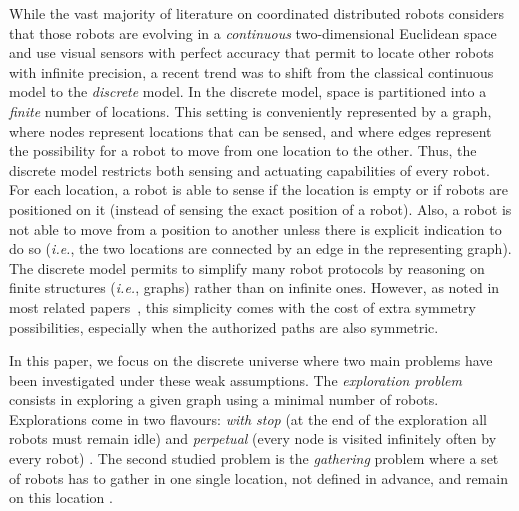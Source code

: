 \documentclass[11pt]{article}
\begin{document}
While the vast majority of literature on coordinated distributed robots considers that those robots are evolving in a \emph{continuous} two-dimensional Euclidean space and use visual sensors with perfect accuracy that permit to locate other robots with infinite precision, a recent trend was to shift from the classical continuous model to the \emph{discrete} model. In the discrete model, space is partitioned into a \emph{finite} number of locations. This setting is conveniently represented by a graph, where nodes represent locations that can be sensed, and where edges represent the possibility for a robot to move from one location to the other. Thus, the discrete model restricts both sensing and actuating capabilities of every robot. For each location, a robot is able to sense if the location is empty or if robots are positioned on it (instead of sensing the exact position of a robot). Also, a robot is not able to move from a position to another unless there is explicit indication to do so (\emph{i.e.}, the two locations are connected by an edge in the representing graph). The discrete model permits to simplify many robot protocols by reasoning on finite structures (\emph{i.e.}, graphs) rather than on infinite ones. However, as noted in most related papers~\cite{Marco06,Kowalski04,davi07,Devismes09,Lamani10,Blin10,Izumi10,Flocchin04,Klasing08,Klasing06}, this simplicity comes with the cost of extra symmetry possibilities, especially when the authorized paths are also symmetric.

In this paper, we focus on the discrete universe where two main problems have been investigated under these weak assumptions. The \textit{exploration problem} consists in exploring a given graph using a minimal number of robots. Explorations come in two flavours: \emph{with stop} (at the end of the exploration all robots must remain idle) \cite{davi07,Devismes09,Lamani10} and \emph{perpetual} (every node is visited infinitely often by every robot) \cite{Blin10}. The second studied problem is the \emph{gathering} problem where a set of robots has to gather in one single location, not defined in advance, and remain on this location \cite{Izumi10,Flocchin04,Klasing08,Klasing06}. 
\end{document}

